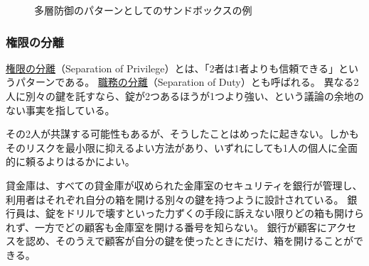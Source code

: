 \documentclass[uplatex]{jsarticle}
\def\label#1{}%
\begin{document}
\begin{figure}[H]
\centering
{}
\caption{多層防御のパターンとしてのサンドボックスの例}\label{fig:ch4-sandbox}
\end{figure}

\subsubsection{権限の分離}

\begin{dfn}[権限の分離]\label{dfn:ch4-separation-of-privilege}
\underline{権限の分離}（Separation of Privilege）とは、「2者は1者よりも信頼できる」というパターンである。
\underline{職務の分離}（Separation of Duty）とも呼ばれる。
異なる2人に別々の鍵を託すなら、錠が2つあるほうが1つより強い、という議論の余地のない事実を指している。
\end{dfn}

その2人が共謀する可能性もあるが、そうしたことはめったに起きない。しかもそのリスクを最小限に抑えるよい方法があり、いずれにしても1人の個人に全面的に頼るよりはるかによい。

\begin{exa}[貸金庫]\label{exa:ch4-safe-deposit-box}
貸金庫は、すべての貸金庫が収められた金庫室のセキュリティを銀行が管理し、利用者はそれぞれ自分の箱を開ける別々の鍵を持つように設計されている。
銀行員は、錠をドリルで壊すといった力ずくの手段に訴えない限りどの箱も開けられず、一方でどの顧客も金庫室を開ける番号を知らない。
銀行が顧客にアクセスを認め、そのうえで顧客が自分の鍵を使ったときにだけ、箱を開けることができる。
\end{exa}
\end{document}
